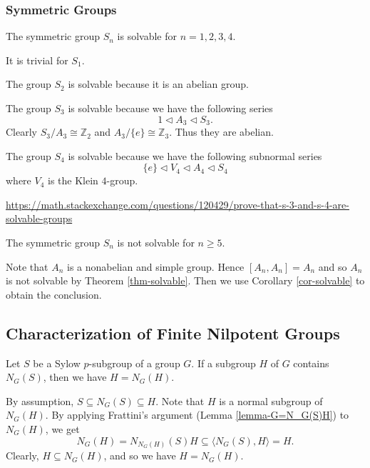 \subsubsection{Symmetric Groups}
\begin{proposition}
	The symmetric group $S_n$ is solvable for $n=1,2,3,4$.
\end{proposition}
\begin{sketch} It is trivial for $S_1$.
	

	The group $S_2$ is solvable because it is an abelian group.
	
	The group $S_3$ is solvable because we have the following series
	\begin{equation*}
		1 \lhd A_3 \lhd S_3.
	\end{equation*}
	Clearly  $S_3/A_3\cong \mathbb{Z}_2$ and $A_3/\{e\} \cong \mathbb{Z}_3$. Thus they are abelian.  
	
	The group $S_4$ is solvable because we have the following subnormal series
	\begin{equation*}
		\{e\} \lhd V_4 \lhd A_4\lhd S_4
	\end{equation*}
	where $V_4$ is the Klein $4$-group.
	
	\url{https://math.stackexchange.com/questions/120429/prove-that-s-3-and-s-4-are-solvable-groups}
\end{sketch}
\begin{proposition}
	The symmetric group $S_n$ is not solvable for $n\geq 5$.
\end{proposition}
\begin{sketch}
	Note that $A_n$ is a nonabelian and simple group. Hence $[A_n,A_n] = A_n$ and so $A_n$ is not solvable by Theorem \ref{thm-solvable}. Then we use Corollary \ref{cor-solvable} to obtain the conclusion.
\end{sketch}

\subsection{Characterization of Finite Nilpotent Groups}



\begin{lemma} \label{lemma-H=N_G(H)}
	Let $S$ be a Sylow $p$-subgroup of a group $G$. If a subgroup $H$ of $G$ contains $N_G(S)$, then we have $H = N_G(H)$.
\end{lemma}
\begin{sketch}
	By assumption, $S \subseteq N_G(S) \subseteq H$. Note that $H$ is a normal subgroup of $N_G(H)$. By applying Frattini's argument (Lemma \ref{lemma-G=N_G(S)H}) to $N_G(H)$, we  get
	$$N_G(H) = N_{N_G(H)}(S)H \subseteq \langle N_G(S), H \rangle = H.$$
	Clearly, $H \subseteq N_G(H)$, and so we have $H = N_G(H)$.
\end{sketch}

